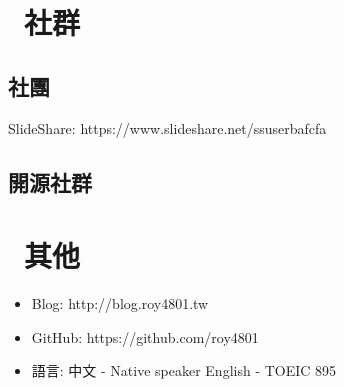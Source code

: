 \documentclass{resume}
\begin{document}
\section{\faUsers\ 社群}

\subsection{社團}
SlideShare: https://www.slideshare.net/ssuserbafcfa

\subsection{開源社群}

\section{\faInfo\ 其他}
\begin{itemize}[parsep=0.5ex]
  \item Blog: http://blog.roy4801.tw
  \item GitHub: https://github.com/roy4801
  \item 語言:
    \subitem 中文 - Native speaker
    \subitem English - TOEIC 895
\end{itemize}

% 
% 
\end{document}
